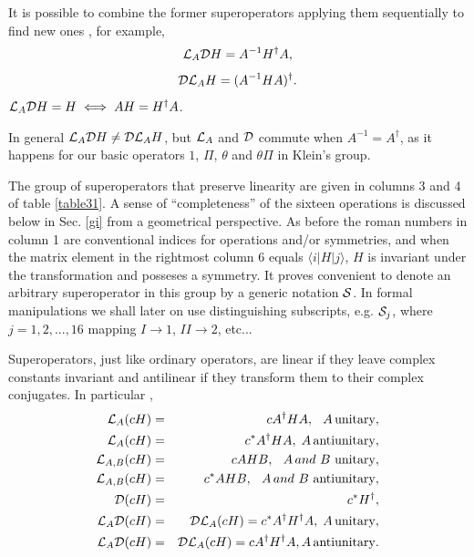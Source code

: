 It is possible to combine the former superoperators applying them sequentially to find new ones \cite{Simon2018},
for example,
%
\begin{equation}
{\cal{L}}_{A}{\cal{D}}H=A^{-1}H^{\dagger}A,
\end{equation}
\begin{equation}
{\cal{D}}{\cal{L}}_{A}H=(A^{-1}HA)^{\dagger}.
\end{equation}
%
${\cal{L}}_{A}{\cal{D}}H=H\iff AH=H^\dagger A$.
{In general  ${\cal{L}}_{A}{\cal{D}}H \neq {\cal{D}}{\cal{L}}_{A}H $, but ${\cal{L}}_{A}$ and ${\cal{D}}$   commute when $A^{-1}=A^{\dagger}$, as it happens for our basic operators $1$, $\Pi$, $\theta$ and $\theta\Pi$ in Klein's group.





The group of superoperators that preserve linearity are given in columns 3 and 4 of table \ref{table31}.
A sense of  ``completeness'' of the sixteen operations is discussed below in Sec. \ref{gi} from a geometrical perspective.
As before the roman numbers in column 1 are conventional indices for operations and/or symmetries, and when the matrix element in the rightmost column 6 equals $\langle i|H|j\rangle$,
$H$ is invariant under the transformation and posseses a symmetry.
It proves convenient to denote an arbitrary superoperator in this group by a generic notation ${\cal S}$.
In formal manipulations we shall later on use distinguishing subscripts, e.g.  ${\cal S}_j$, where $j=1, 2,...,16$ mapping $I\to 1$, $II\to2$, etc...


Superoperators,  just like ordinary operators,  are linear if they leave complex constants invariant and antilinear if they transform them to their complex conjugates.
In particular  \cite{Simon2018},
%
%
\begin{eqnarray}
{\cal{L}}_A (c H)&=& c A^\dagger  H A,\;\;\,  A\, {\rm unitary},
\nonumber\\
{\cal L}_A (c H)&=& c^* A^\dagger  H A,\;  A\, {\rm antiunitary},
\nonumber\\
{\cal{L}}_{A,B} (c H)&=& c A  H B,\;\;\,  A\, and \ B \ {\rm unitary},
\nonumber\\
{\cal{L}}_{A,B} (c H)&=& c^{*} A  H B,\;\;\,  A\, and \ B \ {\rm antiunitary},
\nonumber\\
{\cal D} (c H)&=& c^*H^\dagger,
\nonumber\\
{\cal L}_A  {\cal D} (cH)&=&{\cal D} {\cal L}_A  (cH)=c^* A^\dagger H^\dagger A,\;
A\, {\rm{unitary}},
\nonumber\\
{\cal L}_A  {\cal D} (cH)&=&{\cal D} {\cal L}_A  (cH)= c A^\dagger H^\dagger A,
A\, {\rm{antiunitary}}.
\end{eqnarray}
%


}
